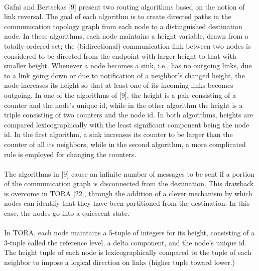 \paragraph{}Gafni and Bertsekas [9] present two routing algorithms based on the notion of link reversal. The goal of each algorithm is to create directed paths in the communication topology graph from each node to a distinguished destination node. In these algorithms, each node maintains a height variable, drawn from a totally-ordered set; the (bidirectional) communication link between two nodes is considered to be directed from the endpoint with larger height to that with smaller height. Whenever a node becomes a sink, i.e., has no outgoing links, due to a link going down or due to notification of a neighbor’s changed height, the node increases its height so that at least one of its incoming links becomes outgoing. In one of the algorithms of [9], the height is a pair consisting of a counter and the node’s unique id, while in the other algorithm the height is a triple consisting of two counters and the node id. In both algorithms, heights are compared lexicographically with the least significant component being the node id. In the first algorithm, a sink increases its counter to be larger than the counter of all its neighbors, while in the second algorithm, a more complicated rule is employed for changing the counters.
\paragraph{}The algorithms in [9] cause an infinite number of messages to be sent if a portion of the communication graph is disconnected from the destination. This drawback is overcome in TORA [22], through the addition of a clever mechanism by which nodes can identify that they have been partitioned from the destination. In this case, the nodes go into a quiescent state.
\paragraph{}In TORA, each node maintains a 5-tuple of integers for its height, consisting of a 3-tuple called the reference level, a delta component, and the node’s unique id. The height tuple of each node is lexicographically compared to the tuple of each neighbor to impose a logical direction on links (higher tuple toward lower.)

